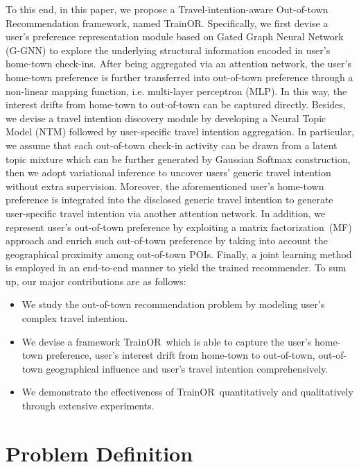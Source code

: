 \documentclass[letterpaper]{article} %
\newcommand{\ourmodel}{{\sc TrainOR}}
\begin{document}
To this end, in this paper, we propose a {\sc Tra}vel-{\sc in}tention-aware {\sc O}ut-of-town {\sc R}ecommendation framework, named \ourmodel.
Specifically,
we first devise a user's preference representation module based on Gated Graph Neural Network (G-GNN) to explore the underlying structural information encoded in user's home-town check-ins.
After being aggregated via an attention network, the user's home-town preference is further transferred into out-of-town preference through a non-linear mapping function, i.e. multi-layer perceptron (MLP).
In this way, the interest drifts from home-town to out-of-town can be captured directly.
Besides, we devise a travel intention discovery module by developing a Neural Topic Model (NTM) followed by user-specific travel intention aggregation.
In particular, we assume that each out-of-town check-in activity can be drawn from a latent topic mixture which can be further generated by Gaussian Softmax construction, then we adopt variational inference to uncover users' generic travel intention without extra supervision.
Moreover, the aforementioned user's home-town preference is integrated into the disclosed generic travel intention to generate user-specific travel intention via another attention network.
In addition, we represent user's out-of-town preference by exploiting a matrix factorization~(MF) approach and enrich such out-of-town preference by taking into account the geographical proximity among out-of-town POIs.
Finally, a joint learning method is employed in an end-to-end manner to yield the trained recommender.
To sum up, our major contributions are as follows:
\begin{itemize}
    \item
    We study the out-of-town recommendation problem by modeling user's complex travel intention.
    \item
    We devise a framework \ourmodel~which is able to capture the user's home-town preference, user's interest drift from home-town to out-of-town, out-of-town geographical influence and user's travel intention comprehensively.
    \item
    We demonstrate the effectiveness of \ourmodel~quantitatively and qualitatively through extensive experiments.
\end{itemize}


\section{Problem Definition} \label{sec:pre}
\end{document}
